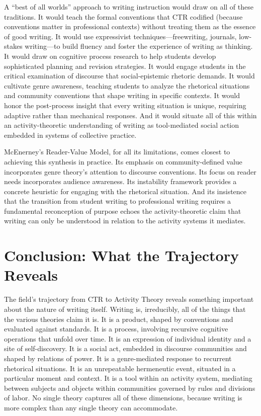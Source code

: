 \documentclass[12pt]{article}
\begin{document}
A ``best of all worlds'' approach to writing instruction would draw on all of these traditions. It would teach the formal conventions that CTR codified (because conventions matter in professional contexts) without treating them as the essence of good writing. It would use expressivist techniques---freewriting, journals, low-stakes writing---to build fluency and foster the experience of writing as thinking. It would draw on cognitive process research to help students develop sophisticated planning and revision strategies. It would engage students in the critical examination of discourse that social-epistemic rhetoric demands. It would cultivate genre awareness, teaching students to analyze the rhetorical situations and community conventions that shape writing in specific contexts. It would honor the post-process insight that every writing situation is unique, requiring adaptive rather than mechanical responses. And it would situate all of this within an activity-theoretic understanding of writing as tool-mediated social action embedded in systems of collective practice.

McEnerney's Reader-Value Model, for all its limitations, comes closest to achieving this synthesis in practice. Its emphasis on community-defined value incorporates genre theory's attention to discourse conventions. Its focus on reader needs incorporates audience awareness. Its instability framework provides a concrete heuristic for engaging with the rhetorical situation. And its insistence that the transition from student writing to professional writing requires a fundamental reconception of purpose echoes the activity-theoretic claim that writing can only be understood in relation to the activity systems it mediates.

\section{Conclusion: What the Trajectory Reveals}

The field's trajectory from CTR to Activity Theory reveals something important about the nature of writing itself. Writing is, irreducibly, all of the things that the various theories claim it is. It is a product, shaped by conventions and evaluated against standards. It is a process, involving recursive cognitive operations that unfold over time. It is an expression of individual identity and a site of self-discovery. It is a social act, embedded in discourse communities and shaped by relations of power. It is a genre-mediated response to recurrent rhetorical situations. It is an unrepeatable hermeneutic event, situated in a particular moment and context. It is a tool within an activity system, mediating between subjects and objects within communities governed by rules and divisions of labor. No single theory captures all of these dimensions, because writing is more complex than any single theory can accommodate.
\end{document}
